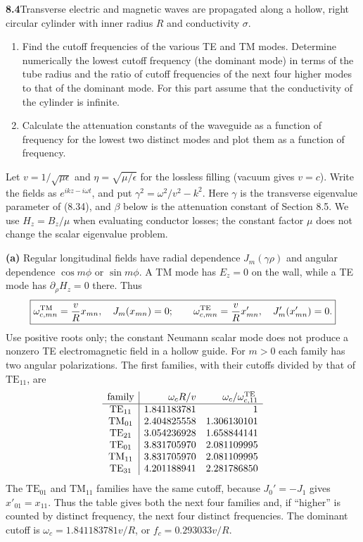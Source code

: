 \par\bigskip
\noindent\textbf{8.4}\quad Transverse electric and magnetic waves are propagated along a hollow, right circular cylinder with inner radius $R$ and conductivity $\sigma$.
\begin{enumerate}
\item[(a)] Find the cutoff frequencies of the various TE and TM modes. Determine numerically the lowest cutoff frequency (the dominant mode) in terms of the tube radius and the ratio of cutoff frequencies of the next four higher modes to that of the dominant mode. For this part assume that the conductivity of the cylinder is infinite.
\item[(b)] Calculate the attenuation constants of the waveguide as a function of frequency for the lowest two distinct modes and plot them as a function of frequency.
\end{enumerate}
\solution

Let $v=1/\sqrt{\mu\epsilon}$ and $\eta=\sqrt{\mu/\epsilon}$ for
the lossless filling (vacuum gives $v=c$).  Write the fields as
$e^{ikz-i\omega t}$, and put $\gamma^2=\omega^2/v^2-k^2$.
Here $\gamma$ is the transverse eigenvalue parameter of (8.34),
and $\beta$ below is the attenuation constant of Section 8.5.
We use $H_z=B_z/\mu$ when evaluating conductor losses; the
constant factor $\mu$ does not change the scalar eigenvalue problem.

\textbf{(a)} Regular longitudinal fields have radial dependence
$J_m(\gamma\rho)$ and angular dependence $\cos m\phi$ or
$\sin m\phi$.  A TM mode has $E_z=0$ on the wall, while a TE
mode has $\partial_\rho H_z=0$ there.  Thus
\[
\boxed{\omega_{c,mn}^{\rm TM}=\frac vR x_{mn},\quad J_m(x_{mn})=0;
\qquad\omega_{c,mn}^{\rm TE}=\frac vR x'_{mn},\quad J_m'(x'_{mn})=0.}
\]
Use positive roots only; the constant Neumann scalar mode does not
produce a nonzero TE electromagnetic field in a hollow guide.
For $m>0$ each family has two angular polarizations.  The first
families, with their cutoffs divided by that of $\mathrm{TE}_{11}$,
are
\[
\begin{array}{c|rr}
\text{family}&\omega_cR/v&\omega_c/\omega_{c,11}^{\rm TE}\\\hline
\mathrm{TE}_{11}&1.841183781&1\\
\mathrm{TM}_{01}&2.404825558&1.306130101\\
\mathrm{TE}_{21}&3.054236928&1.658844141\\
\mathrm{TE}_{01}&3.831705970&2.081109995\\
\mathrm{TM}_{11}&3.831705970&2.081109995\\
\mathrm{TE}_{31}&4.201188941&2.281786850
\end{array}
\]
The $\mathrm{TE}_{01}$ and $\mathrm{TM}_{11}$ families have the same
cutoff, because $J_0'=-J_1$ gives $x'_{01}=x_{11}$.  Thus the table gives
both the next four families and, if ``higher'' is counted by distinct
frequency, the next four distinct frequencies.  The dominant cutoff
is $\omega_c=1.841183781v/R$, or $f_c=0.293033v/R$.


